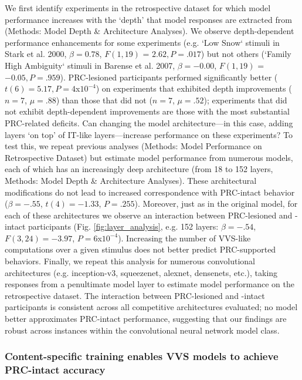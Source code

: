 \documentclass[11pt]{article}
\begin{document}
We first identify experiments in the retrospective dataset for which model performance increases with the `depth' that model responses are extracted from (Methods: Model Depth \& Architecture Analyses). We observe depth-dependent performance enhancements for some experiments (e.g. `Low Snow` stimuli in Stark et al. 2000,  $\beta = 0.78$, $F(1, 19)$ = $2.62, P = .017$) but not others (`Family High Ambiguity` stimuli in Barense et al. 2007, $\beta = -0.00$, $F(1, 19)$ = $-0.05, P = .959$). PRC-lesioned participants performed significantly better ($t(6) = 5.17,P = 4$x$10^{-4}$) on experiments that exhibited depth improvements ($n=7$, $\mu=.88$) than those that did not ($n=7$, $\mu=.52$); experiments that did not exhibit depth-dependent improvements are those with the most substantial PRC-related deficits. Can changing the model architecture---in this case, adding layers  `on top' of IT-like layers---increase performance on these experiments? To test this, we repeat previous analyses (Methods: Model Performance on Retrospective Dataset) but estimate model performance from numerous models, each of which has an increasingly deep architecture (from 18 to 152 layers, Methods: Model Depth \& Architecture Analyses). These architectural modifications do not lead to increased correspondence with PRC-intact behavior ($\beta = -.55$,  $t(4) =-1.33$, $P = .255$). Moreover, just as in the original model, for each of these architectures we observe an interaction between PRC-lesioned and -intact participants (Fig. \ref{fig:layer_analysis}, e.g. 152 layers: $\beta = -.54$,  $F(3, 24) =-3.97$, $P = 6$x$10^{-4}$). Increasing the number of VVS-like computations over a given stimulus does not better predict PRC-supported behaviors. Finally, we repeat this analysis for numerous convolutional architectures (e.g. inception-v3, squeezenet, alexnet, densenets, etc.), taking responses from a penultimate model layer to estimate model performance on the retrospective dataset. The interaction between PRC-lesioned and -intact participants is consistent across all competitive architectures evaluated; no model better approximates PRC-intact performance, suggesting that our findings are robust across instances within the convolutional neural network model class. 

\subsubsection{Content-specific training enables VVS models to achieve PRC-intact accuracy}
\end{document}
